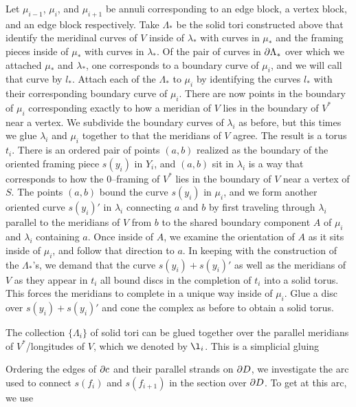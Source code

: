 Let $\mu_{i-1}$, $\mu_i$, and $\mu_{i+1}$ be annuli corresponding to an edge block, a vertex block, and an edge block respectively.
Take $\Lambda_*$ be the solid tori constructed above that identify the meridinal curves of $V$ inside of $\lambda_*$ with curves in $\mu_*$ and the framing pieces inside of $\mu_*$ with curves in $\lambda_*$.
Of the pair of curves in $\partial \Lambda_*$ over which we attached $\mu_*$ and $\lambda_*$, one corresponds to a boundary curve of $\mu_i$, and we will call that curve by $l_*$.
Attach each of the $\Lambda_*$ to $\mu_i$ by identifying the curves $l_*$ with their corresponding boundary curve of $\mu_i$.
There are now points in the boundary of $\mu_i$ corresponding exactly to how a meridian of $V$ lies in the boundary of $V^*$ near a vertex.
We subdivide the boundary curves of $\lambda_i$ as before, but this times we glue $\lambda_i$ and $\mu_i$ together to that the meridians of $V$ agree.
The result is a torus $t_i$.
There is an ordered pair of points $(a,b)$ realized as the boundary of the oriented framing piece $s(y_i)$ in $Y_i$, and $(a,b)$ sit in $\lambda_i$ is a way that corresponds to how the 0--framing of $V^*$ lies in the boundary of $V$ near a vertex of $S$.
The points $(a,b)$ bound the curve $s(y_i)$ in $\mu_i$, and we form another oriented curve $s(y_i)'$ in $\lambda_i$ connecting $a$ and $b$ by first traveling through $\lambda_i$ parallel to the meridians of $V$ from $b$ to the shared boundary component $A$ of $\mu_i$ and $\lambda_i$ containing $a$.
Once inside of $A$, we examine the orientation of $A$ as it sits inside of $\mu_i$, and follow that direction to $a$.
In keeping with the construction of the $\Lambda_*$'s, we demand that the curve $s(y_i)+s(y_i)'$ as well as the meridians of $V$ as they appear in $t_i$ all bound discs in the completion of $t_i$ into a solid torus.
This forces the meridians to complete in a unique way inside of $\mu_i$.
Glue a disc over $s(y_i)+s(y_i)'$ and cone the complex as before to obtain a solid torus.

The collection $\{\Lambda_i\}$ of solid tori can be glued together over the parallel meridians of $V^*$/longitudes of $V$, which we denoted by $\l_i$.
This is a simplicial gluing 














Ordering the edges of $\partial c$ and their parallel strands on $\partial D$, we investigate the arc used to connect $s(f_i)$ and $s(f_{i+1})$ in the section over $\partial D$.
To get at this arc, we use

